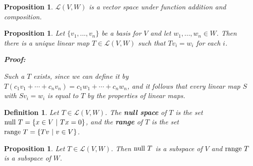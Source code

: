 \documentclass{article}
\theoremstyle{colontheorem}
\newtheorem{proposition}[theorem]{Proposition}
\newtheorem{definition}[theorem]{Definition}
\newcommand{\Null}{\textnormal{null }}
\newcommand{\Range}{\textnormal{range }}
\newenvironment{Proposition}
{
	\begin{mdframed}[backgroundcolor=PropPink!10]
	\begin{proposition}
}
{
	\end{proposition}
	\end{mdframed}
	
	\vspace{.15in}
}
\newenvironment{Def}
{
	\begin{mdframed}[backgroundcolor=DefGreen!10]
	\begin{definition}
}
{
	\end{definition}
	\end{mdframed}
	
	\vspace{.15in}
}
\newenvironment{Proof}
{
	\begin{mdframed}[backgroundcolor=ProofPurple!10]
	\textbf{Proof:}%
}
{
	\end{mdframed}
	
	\vspace{.085in}
}
\begin{document}
\begin{Proposition}
	
	$\mathcal{L}(V, W)$ is a vector space under function addition and composition.
	
\end{Proposition}



\begin{Proposition}
	
	Let $\{v_1, ..., v_n\}$ be a basis for $V$ and let $w_1, ..., w_n \in W$. Then there is a unique linear map $T \in \mathcal{L}(V,W)$ such that $Tv_i = w_i$ for each $i$.
	
	\begin{Proof}
		Such a $T$ exists, since we can define it by $T(c_1 v_1 + \cdots + c_n v_n) = c_1 w_1 + \cdots + c_n w_n$, and it follows that every linear map $S$ with $Sv_i = w_i$ is equal to $T$ by the properties of linear maps.
		
	\end{Proof}
	
\end{Proposition}



\begin{Def}
	
	Let $T \in \mathcal{L}(V,W)$. The \textbf{null space} of $T$ is the set $\Null T = \{x \in V\ |\ Tx = 0\}$, and the \textbf{range} of $T$ is the set $\Range T = \{Tv\ |\ v \in V\}$.
	
\end{Def}



\begin{Proposition}
	
	Let $T \in \mathcal{L}(V,W)$. Then $\Null T$ is a subspace of $V$ and $\Range T$ is a subspace of $W$.
	
\end{Proposition}
\end{document}
